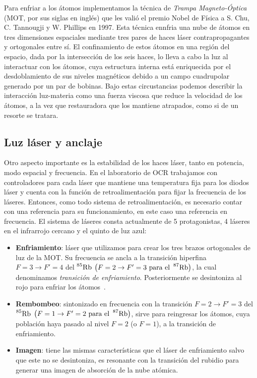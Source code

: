 Para enfriar a los átomos implementamos la técnica de \emph{Trampa Magneto-Óptica} (MOT, por sus siglas en inglés) que les valió el premio Nobel de Física a S. Chu, C. Tannougji y W. Phillips en 1997. Esta técnica ennfria una nube de átomos en tres dimensiones espaciales mediante tres pares de haces láser contrapropagantes y ortogonales entre sí. El confinamiento de estos átomos en una región del espacio, dada por la intersección de los seis haces, lo lleva a cabo la luz al interactuar con los átomos, cuya estructura interna está enriquecida por el desdoblamiento de sus niveles magnéticos debido a un campo cuadrupolar generado por un par de bobinas. Bajo estas circustancias podemos describir la interacción luz-materia como una fuerza viscosa que reduce la velocidad de los átomos, a la vez que restauradora que los mantiene atrapados, como si de un resorte se tratara.

\subsection{\label{sub:luzAnclaje}Luz láser y anclaje}

Otro aspecto importante es la estabilidad de los haces láser, tanto en potencia, modo espacial y frecuencia. En el laboratorio de OCR trabajamos con controladores para cada láser que mantiene una temperatura fija para los diodos láser y cuenta con la función de retroalimentación para fijar la frecuencia de los láseres. Entonces, como todo sistema de retroalimentación, es necesario contar con una referencia para su funcionamiento, en este caso una referencia en frecuencia. El sistema de láseres consta actualmente de 5 protagonistas, 4 láseres en el infrarrojo cercano y el quinto de luz azul:

\begin{itemize}
\item \textbf{Enfriamiento}: láser que utilizamos para crear los tres brazos ortogonales de luz de la MOT. Su frecuencia se ancla a la transición hiperfina $F=3\to F'=4$ del $\prescript{85}{}{\mathrm{Rb}}$ $\bigl(F=2\to F'=3\text{ para el }\prescript{87}{}{\mathrm{Rb}}\bigr)$, la cual denominamos \emph{transición de enfriamiento}. Posteriormente se desintoniza al rojo para enfriar los átomos~\cite{foot}.
\item \textbf{Rembombeo}: sintonizado en frecuencia con la transición $F=2\to F'=3$ del $\prescript{85}{}{\mathrm{Rb}}$ $\bigl(F=1\to F'=2\text{ para el }\prescript{87}{}{\mathrm{Rb}}\bigr)$, sirve para reingresar los átomos, cuya población haya pasado al nivel $F=2$ (o $F=1$), a la transición de enfriamiento.
\item \textbf{Imagen}: tiene las mismas características que el láser de enfriamiento salvo que este no se desintoniza, es resonante con la transición del rubidio para generar una imagen de absorción de la nube atómica.
\end{itemize}

